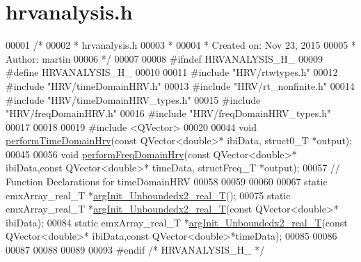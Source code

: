 \hypertarget{hrvanalysis_8h_source}{}\section{hrvanalysis.\+h}
\label{hrvanalysis_8h_source}

\begin{DoxyCode}
00001 \textcolor{comment}{/*}
00002 \textcolor{comment}{ * hrvanalysis.h}
00003 \textcolor{comment}{ *}
00004 \textcolor{comment}{ *  Created on: Nov 23, 2015}
00005 \textcolor{comment}{ *      Author: martin}
00006 \textcolor{comment}{ */}
00007 
00008 \textcolor{preprocessor}{#ifndef HRVANALYSIS\_H\_}
00009 \textcolor{preprocessor}{#define HRVANALYSIS\_H\_}
00010 
00011 \textcolor{preprocessor}{#include "HRV/rtwtypes.h"}
00012 \textcolor{preprocessor}{#include "HRV/timeDomainHRV.h"}
00013 \textcolor{preprocessor}{#include "HRV/rt\_nonfinite.h"}
00014 \textcolor{preprocessor}{#include "HRV/timeDomainHRV\_types.h"}
00015 \textcolor{preprocessor}{#include "HRV/freqDomainHRV.h"}
00016 \textcolor{preprocessor}{#include "HRV/freqDomainHRV\_types.h"}
00017 
00018 
00019 \textcolor{preprocessor}{#include <QVector>}
00020 
00044     \textcolor{keywordtype}{void} \hyperlink{group__HRV-Analysis_ga2bd6c358a622e01babb7fdbca313c50f}{performTimeDomainHrv}(\textcolor{keyword}{const} QVector<double>* ibiData, struct0\_T *output);
00045 
00056     \textcolor{keywordtype}{void} \hyperlink{group__HRV-Analysis_ga3cfec29967efe1561722a05d03f26158}{performFreqDomainHrv}(\textcolor{keyword}{const} QVector<double>* ibiData,\textcolor{keyword}{const} QVector<double>* 
      timeData, structFreq\_T *output);
00057     \textcolor{comment}{// Function Declarations for timeDomainHRV}
00058 
00059 
00060 
00067         \textcolor{keyword}{static} emxArray\_real\_T *\hyperlink{group__HRV-Analysis_ga97aad354e1ec35fab4e98f111f4ed4b4}{argInit\_Unboundedx2\_real\_T}();
00075         \textcolor{keyword}{static} emxArray\_real\_T *\hyperlink{group__HRV-Analysis_ga97aad354e1ec35fab4e98f111f4ed4b4}{argInit\_Unboundedx2\_real\_T}(\textcolor{keyword}{const} QVector<double>*
       ibiData);
00084         \textcolor{keyword}{static} emxArray\_real\_T *\hyperlink{group__HRV-Analysis_ga97aad354e1ec35fab4e98f111f4ed4b4}{argInit\_Unboundedx2\_real\_T}(\textcolor{keyword}{const} QVector<double>*
       ibiData,\textcolor{keyword}{const} QVector<double>*timeData);
00085 
00086 
00087 
00088 
00089 
00093 \textcolor{preprocessor}{#endif }\textcolor{comment}{/* HRVANALYSIS\_H\_ */}\textcolor{preprocessor}{}
\end{DoxyCode}
